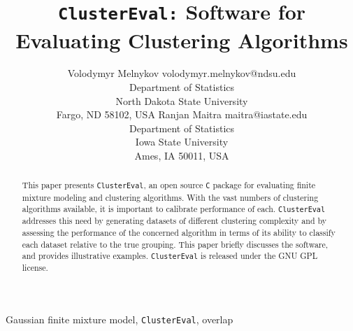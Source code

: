 \documentclass[twoside,11pt]{article}
\begin{document}
\title{\texttt{ClusterEval:} Software for Evaluating Clustering Algorithms}

\author{\name Volodymyr Melnykov \email volodymyr.melnykov@ndsu.edu \\
       \addr Department of Statistics\\
       North Dakota State University\\
       Fargo, ND 58102, USA
       \AND
       \name Ranjan Maitra \email maitra@iastate.edu \\
       \addr Department of Statistics\\
       Iowa State University\\
       Ames, IA 50011, USA}

\editor{}

\maketitle

\begin{abstract}%
This paper presents \texttt{ClusterEval}, an open source \texttt{C}
package for evaluating finite mixture modeling and clustering
algorithms. With the vast numbers of clustering algorithms available,
it is important to calibrate performance of each. \texttt{ClusterEval}
addresses this need by generating datasets of different clustering
complexity and by assessing the performance of the concerned algorithm
in terms of its ability to classify each dataset relative to the true
grouping. This paper briefly discusses the software, and provides
illustrative examples. \texttt{ClusterEval} is released under the GNU
GPL license.    
\end{abstract}

\begin{keywords}
  Gaussian finite mixture model, \texttt{ClusterEval}, overlap
\end{keywords}
\end{document}
